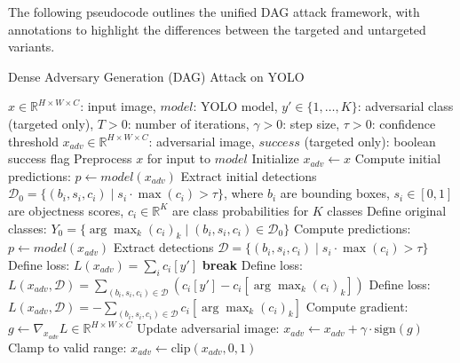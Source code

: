 \documentclass[../main.tex]{subfiles}
\begin{document}
The following pseudocode outlines the unified DAG attack framework, with annotations to highlight the differences between the targeted and untargeted variants.
\begin{breakablealgorithm}{Dense Adversary Generation (DAG) Attack on YOLO}
\begin{algorithmic}[1]
\Require $x \in \mathbb{R}^{H \times W \times C}$: input image, $model$: YOLO model, $y' \in \{1, \dots, K\}$: adversarial class (targeted only), $T > 0$: number of iterations, $\gamma > 0$: step size, $\tau > 0$: confidence threshold
\Ensure $x_{adv} \in \mathbb{R}^{H \times W \times C}$: adversarial image, $success$ (targeted only): boolean success flag
\State Preprocess $x$ for input to $model$ 
\State Initialize $x_{adv} \gets x$ 
\State Compute initial predictions: $p \gets model(x_{adv})$ 
\State Extract initial detections $\mathcal{D}_0 = \{ (b_i, s_i, c_i) \mid s_i \cdot \max(c_i) > \tau \}$, where $b_i$ are bounding boxes, $s_i \in [0, 1]$ are objectness scores, $c_i \in \mathbb{R}^K$ are class probabilities for $K$ classes
\State Define original classes: $Y_0 = \{ \arg\max_k (c_i)_k \mid (b_i, s_i, c_i) \in \mathcal{D}_0 \}$ 
    \State Compute predictions: $p \gets model(x_{adv})$ 
    \State Extract detections $\mathcal{D} = \{ (b_i, s_i, c_i) \mid s_i \cdot \max(c_i) > \tau \}$
            \State Define loss: $L(x_{adv}) = \sum_{i} c_i[y']$ 
        \Else
            \State \textbf{break} 
        \EndIf
    \Else
            \State Define loss: $L(x_{adv}, \mathcal{D}) = \sum_{(b_i, s_i, c_i) \in \mathcal{D}} (c_i[y'] - c_i[\arg\max_k (c_i)_k])$ 
        \Else
            \State Define loss: $L(x_{adv}, \mathcal{D}) = -\sum_{(b_i, s_i, c_i) \in \mathcal{D}} c_i[\arg\max_k (c_i)_k]$ 
        \EndIf
    \EndIf
    \State Compute gradient: $g \gets \nabla_{x_{adv}} L \in \mathbb{R}^{H \times W \times C}$ 
    \State Update adversarial image: $x_{adv} \gets x_{adv} + \gamma \cdot \text{sign}(g)$
    \State Clamp to valid range: $x_{adv} \gets \text{clip}(x_{adv}, 0, 1)$ 

\end{algorithmic}
\end{breakablealgorithm}
\end{document}
